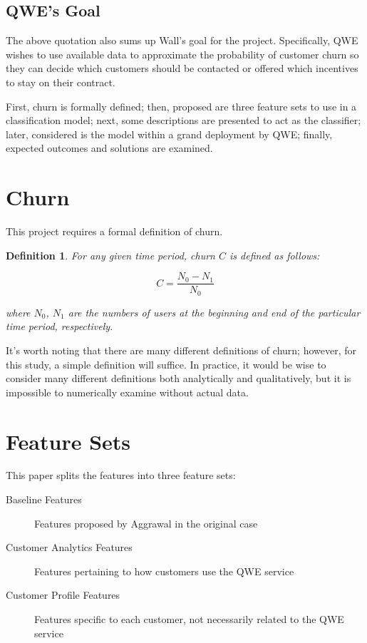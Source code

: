 \documentclass{article}
\newtheorem{Def}{Definition}
\begin{document}
	\subsection{QWE's Goal}
	
	The above quotation also sums up Wall’s goal for the project. Specifically, QWE wishes to use available data to approximate the probability of customer churn so they can decide which customers should be contacted or offered which incentives to stay on their contract.
	
	First, churn is formally defined; then, proposed are three feature sets to use in a classification model; next, some descriptions are presented to act as the classifier; later, considered is the model within a grand deployment by QWE; finally, expected outcomes and solutions are examined.
	
	\section{Churn}
	
	This project requires a formal definition of churn.
	
	\begin{Def}
		\label{ChurnDefinition}
		For any given time period, churn $C$ is defined as follows:
		
		$$C = \frac{N_0 - N_1}{N_0}$$
		
		where $N_0$, $N_1$ are the numbers of users at the beginning and end of the particular time period, respectively.
	\end{Def}

	It's worth noting that there are many different definitions of churn; however, for this study, a simple definition will suffice. In practice, it would be wise to consider many different definitions both analytically and qualitatively, but it is impossible to numerically examine without actual data.
	
	\section{Feature Sets}
	
	This paper splits the features into three feature sets:
	
	\begin{description}
		\item[Baseline Features] Features proposed by Aggrawal in the original case
		\item[Customer Analytics Features] Features pertaining to how customers use the QWE service
		\item[Customer Profile Features] Features specific to each customer, not necessarily related to the QWE service
	\end{description}
\end{document}
